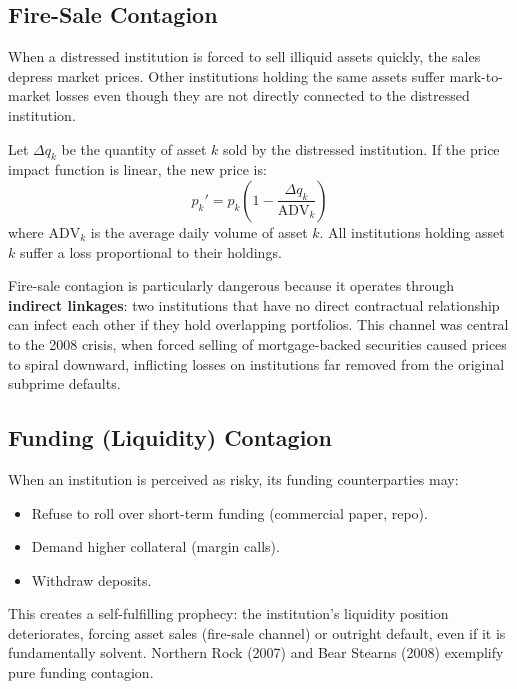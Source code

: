 \documentclass[11pt, a4paper]{article}
\theoremstyle{definition}
\theoremstyle{plain}
\theoremstyle{remark}
\begin{document}
\subsection{Fire-Sale Contagion}

When a distressed institution is forced to sell illiquid assets quickly, the sales
depress market prices.
Other institutions holding the same assets suffer mark-to-market losses even though
they are not directly connected to the distressed institution.

Let $\Delta q_k$ be the quantity of asset $k$ sold by the distressed institution.
If the price impact function is linear, the new price is:
\begin{equation}\label{eq:fire-sale}
    p_k' = p_k\!\left(1 - \frac{\Delta q_k}{\text{ADV}_k}\right)
\end{equation}
where $\text{ADV}_k$ is the average daily volume of asset $k$.
All institutions holding asset $k$ suffer a loss proportional to their holdings.

\begin{warningbox}
Fire-sale contagion is particularly dangerous because it operates through
\textbf{indirect linkages}: two institutions that have no direct contractual
relationship can infect each other if they hold overlapping portfolios.
This channel was central to the 2008 crisis, when forced selling of
mortgage-backed securities caused prices to spiral downward, inflicting
losses on institutions far removed from the original subprime defaults.
\end{warningbox}

\subsection{Funding (Liquidity) Contagion}

When an institution is perceived as risky, its funding counterparties may:
\begin{itemize}
    \item Refuse to roll over short-term funding (commercial paper, repo).
    \item Demand higher collateral (margin calls).
    \item Withdraw deposits.
\end{itemize}

This creates a self-fulfilling prophecy: the institution's liquidity position
deteriorates, forcing asset sales (fire-sale channel) or outright default,
even if it is fundamentally solvent.
Northern Rock (2007) and Bear Stearns (2008) exemplify pure funding contagion.
\end{document}
